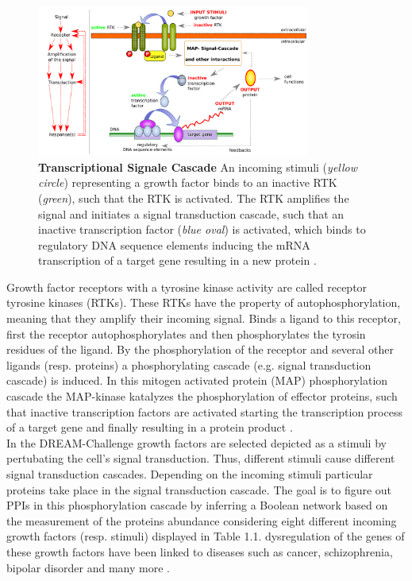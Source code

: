 \begin{figure}[H]
\captionsetup{width=.9\linewidth}
\centering
\includegraphics[width=0.8\textwidth]{./Bilder/GRNDREAM8.pdf}
\caption[Transcriptional Signale Cascade of RTKs]{\textbf{Transcriptional Signale Cascade} An incoming stimuli (\textit{yellow circle}) representing a growth factor binds to an inactive RTK (\textit{green}), such that the RTK is activated. The RTK amplifies the signal and initiates a signal transduction cascade, such that an inactive transcription factor (\textit{blue oval}) is activated, which binds to regulatory DNA sequence elements inducing the mRNA transcription of a target gene resulting in a new protein \citep{U.S.DepartmentofEnergyOfficeofScience.April2001}. }
\label{fig:DREAM8GRN}
\end{figure}


Growth factor receptors with a tyrosine kinase activity are called receptor tyrosine kinases (\gls{RTK}s). These RTKs have the property of autophosphorylation, meaning that they amplify their incoming signal. Binds a ligand to this receptor, first the receptor autophosphorylates and then phosphorylates the tyrosin residues of the ligand. By the phosphorylation of the receptor and several other ligands (resp. proteins) a phosphorylating cascade (e.g. signal transduction cascade) is induced. In this mitogen activated protein (MAP) phosphorylation cascade the \gls{MAP}-kinase katalyzes the phosphorylation of effector proteins, such that inactive transcription factors are activated starting the transcription process of a target gene and finally resulting in a protein product \citep{MullerEsterl.2009}.\\

\newpage
In the DREAM-Challenge growth factors are selected depicted as a stimuli by pertubating the cell's signal transduction. Thus, different stimuli cause different signal transduction cascades. Depending on the incoming stimuli particular proteins take place in the signal transduction cascade. The goal is to figure out PPIs in this phosphorylation cascade by inferring a Boolean network based on the measurement of the proteins abundance considering eight different incoming growth factors (resp. stimuli) displayed in Table 1.1. 
dysregulation of the genes of these growth factors have been linked to diseases such as cancer, schizophrenia, bipolar disorder and many more \citep{NRG1}.


